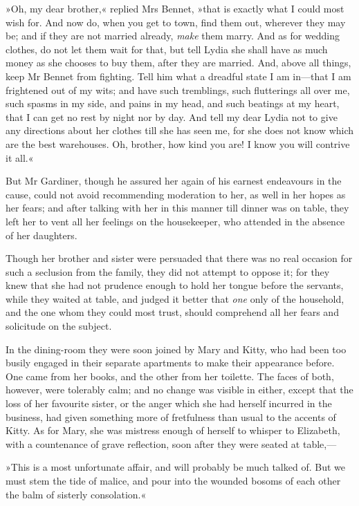 »Oh, my dear brother,« replied Mrs Bennet, »that is exactly what I could most wish for. And now do, when you get to town, find them out, wherever they may be; and if they are not married already, \textit{make} them marry. And as for wedding clothes, do not let them wait for that, but tell Lydia she shall have as much money as she chooses to buy them, after they are married. And, above all things, keep Mr Bennet from fighting. Tell him what a dreadful state I am in—that I am frightened out of my wits; and have such tremblings, such flutterings all over me, such spasms in my side, and pains in my head, and such beatings at my heart, that I can get no rest by night nor by day. And tell my dear Lydia not to give any directions about her clothes till she has seen me, for she does not know which are the best warehouses. Oh, brother, how kind you are! I know you will contrive it all.«

But Mr Gardiner, though he assured her again of his earnest endeavours in the cause, could not avoid recommending moderation to her, as well in her hopes as her fears; and after talking with her in this manner till dinner was on table, they left her to vent all her feelings on the housekeeper, who attended in the absence of her daughters.

Though her brother and sister were persuaded that there was no real occasion for such a seclusion from the family, they did not attempt to oppose it; for they knew that she had not prudence enough to hold her tongue before the servants, while they waited at table, and judged it better that \textit{one} only of the household, and the one whom they could most trust, should comprehend all her fears and solicitude on the subject.

In the dining-room they were soon joined by Mary and Kitty, who had been too busily engaged in their separate apartments to make their appearance before. One came from her books, and the other from her toilette. The faces of both, however, were tolerably calm; and no change was visible in either, except that the loss of her favourite sister, or the anger which she had herself incurred in the business, had given something more of fretfulness than usual to the accents of Kitty. As for Mary, she was mistress enough of herself to whisper to Elizabeth, with a countenance of grave reflection, soon after they were seated at table,—

»This is a most unfortunate affair, and will probably be much talked of. But we must stem the tide of malice, and pour into the wounded bosoms of each other the balm of sisterly consolation.«

